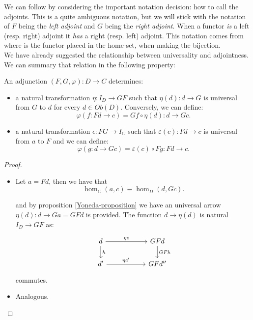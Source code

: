 We can follow by considering the important notation decision: how to call the adjoints. This is a quite ambiguous notation, but we will stick with the notation of $F$ being the \emph{left adjoint} and $G$ being the \emph{right adjoint}. When a functor \emph{is} a left (resp. right) adjoint it \emph{has} a right (resp. left) adjoint. This notation comes from where is the functor placed in the home-set, when making the bijection.\\

We have already suggested the relationship between universality and adjointness. We can summary that relation in the following property:
\begin{proposition}\label{prop:univAdjoint}
  An adjunction $(F,G,\varphi): D\to C $ determines:
  \begin{itemize}
  \item a natural transformation $\eta: I_D \to GF$ such that $\eta(d):d\to G$ is universal from $G$ to $d$ for every $d\in Ob(D)$. Conversely, we can define:
    $$\varphi(f:Fd\to c) = Gf\circ \eta(d): d\to G c.$$
  \item a natural transformation $\epsilon: FG\to I_C$ such that $\varepsilon(c):Fd\to c$ is universal from $a$ to $F$ and we can define:
    $$\varphi(g:d\to Gc) = \varepsilon(c)\circ Fg: Fd\to c.$$
  \end{itemize}
\end{proposition}
\begin{proof}
  \begin{itemize}
  \item Let $a=Fd$, then we have that
    $$\hom_C(a, c)\equiv\hom_D(d, Gc).$$

    and by proposition \ref{Yoneda-proposition} we have an universal arrow $\eta (d):d\to Ga=GFd$ is provided. The function $d\to \eta(d)$ is natural $I_D\to GF$ as:
    \[
  \begin{tikzpicture}
  \node {\begin{tikzcd}[column sep=20mm]
      d\ar[r,"\eta c"]\ar[d,"h"] & GFd\ar[d,"GFh"]\\
      d'\ar[r,"\eta c'"] & GFd''
  \end{tikzcd}};
\end{tikzpicture}
\]
commutes. 
  \item Analogous.
  \end{itemize} 
\end{proof}


